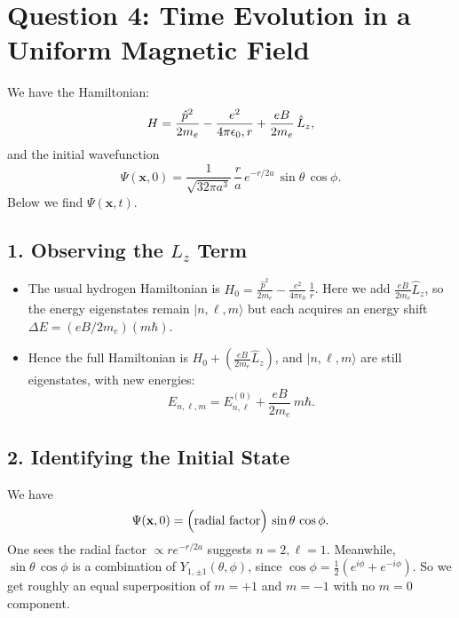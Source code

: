 \documentclass[12pt]{article}
\begin{document}
\section*{Question 4: Time Evolution in a Uniform Magnetic Field}
We have the Hamiltonian:
\begin{equation}
H = \frac{\hat{p}^2}{2m_e} - \frac{e^2}{4\pi \epsilon_0 \\,r} + \frac{eB}{2m_e}\,\hat{L}_z,
\end{equation}
and the initial wavefunction
\begin{equation}
\Psi(\mathbf{x},0) = \frac{1}{\sqrt{32\pi a^3}}\,\frac{r}{a}\,e^{-r/2a}\,\sin\theta\,\cos\phi.
\end{equation}
Below we find $\Psi(\mathbf{x},t)$.

\subsection*{1. Observing the $\hat{L}_z$ Term}
\begin{itemize}
\item The usual hydrogen Hamiltonian is $H_0 = \tfrac{\hat{p}^2}{2m_e} - \tfrac{e^2}{4\pi\epsilon_0}\,\tfrac{1}{r}$. Here we add $\tfrac{eB}{2m_e}\hat{L}_z$, so the energy eigenstates remain $|n,\ell,m\rangle$ but each acquires an energy shift $\Delta E = (eB/2m_e)(m\hbar)$.
\item Hence the full Hamiltonian is $H_0 + (\tfrac{eB}{2m_e}\hat{L}_z)$, and $|n,\ell,m\rangle$ are still eigenstates, with new energies:
\begin{equation}
E_{n,\ell,m} = E_{n,\ell}^{(0)} + \frac{eB}{2m_e}\,m\hbar.
\end{equation}
\end{itemize}

\subsection*{2. Identifying the Initial State}
We have
\begin{equation}
\Psi(\mathbf{x},0) = \Bigl(\text{radial factor}\Bigr)\,\sin\theta\,\cos\phi.
\end{equation}
One sees the radial factor $\propto r e^{-r/2a}$ suggests $n=2,\ell=1$. Meanwhile, $\sin\theta\,\cos\phi$ is a combination of $Y_{1,\pm1}(\theta,\phi)$, since $\cos\phi = \tfrac{1}{2}(e^{i\phi}+e^{-i\phi})$. So we get roughly an equal superposition of $m=+1$ and $m=-1$ with no $m=0$ component.
\end{document}
